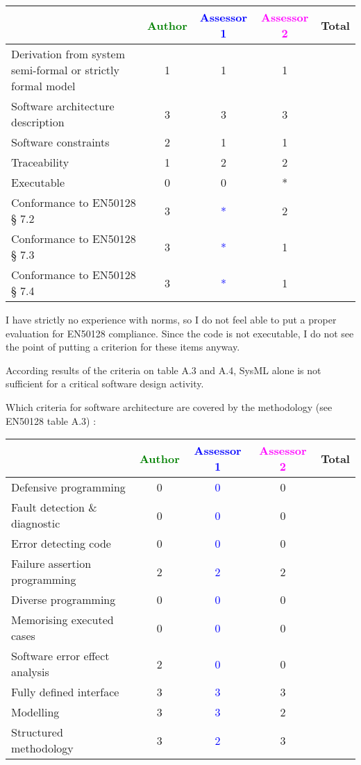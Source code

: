 \begin{tabular}{|l | c | c | c | c|}
\hline
& \textcolor{green}{Author} & \textcolor{blue}{Assessor 1} & \textcolor{magenta}{Assessor 2} & Total \\
\hline
Derivation from system semi-formal or strictly formal model & 1 & 1 & 1 & \\
\hline
Software architecture description & 3 & 3 & 3 & \\
\hline
Software constraints & 2 & 1 & 1 & \\
\hline
Traceability & 1 & 2 & 2 & \\
\hline
Executable & 0 & 0 & * & \\
\hline
Conformance to EN50128 § 7.2 & 3 & \textcolor{blue}{*} & 2 & \\
\hline
Conformance to EN50128 § 7.3 & 3 & \textcolor{blue}{*} & 1 & \\
\hline
Conformance to EN50128 § 7.4 & 3 & \textcolor{blue}{*} & 1 & \\
\hline
\end{tabular}

\begin{assessor1}
I have strictly no experience with norms, so I do not feel able to put a proper evaluation for EN50128 compliance. Since the code is not executable, I do not see the point of putting a criterion for these items anyway. 
\end{assessor1}


\begin{assessor2}
According results of the criteria on table A.3 and A.4, SysML alone is not sufficient for a critical software design activity.
\end{assessor2}


Which criteria for software architecture are covered by the methodology
(see EN50128 table A.3) :

\begin{tabular}{|l | c | c | c | c|}
\hline
& \textcolor{green}{Author} & \textcolor{blue}{Assessor 1} & \textcolor{magenta}{Assessor 2} & Total \\
\hline
Defensive programming & 0 & \textcolor{blue}{0} & 0 & \\
\hline
Fault detection \& diagnostic & 0 & \textcolor{blue}{0} & 0 & \\
\hline
Error detecting code & 0 & \textcolor{blue}{0} & 0 & \\
\hline
Failure assertion programming & 2 & \textcolor{blue}{2} & 2 & \\
\hline
Diverse programming & 0 & \textcolor{blue}{0} & 0 & \\
\hline
Memorising executed cases & 0 & \textcolor{blue}{0} & 0 & \\
\hline
Software error effect analysis & 2 & \textcolor{blue}{0} & 0 & \\
\hline
Fully defined interface & 3 & \textcolor{blue}{3} & 3 & \\
\hline
Modelling & 3 & \textcolor{blue}{3} & 2 & \\
\hline
Structured methodology & 3 & \textcolor{blue}{2} & 3 & \\
\hline
\end{tabular}

